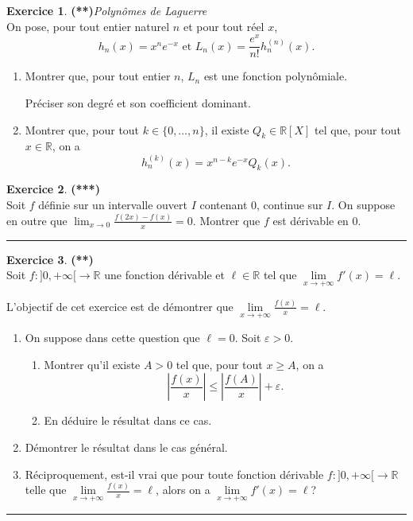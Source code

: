 \documentclass[a4paper,11pt]{article}
\theoremstyle{definition}
\newtheorem{exo}{Exercice} %
\begin{document}
	

\begin{exo}\textbf{(**)}\quad\textit{Polynômes de Laguerre}\\[0.25cm]
On pose, pour tout entier naturel $n$ et pour tout réel $x$, 
$$h_n(x)=x^ne^{-x}\textrm{ et }L_n(x)=\frac{e^x}{n!}h_n^{(n)}(x).$$
\begin{enumerate}
	\item Montrer que, pour tout entier $n$, $L_n$ est une fonction polynômiale. 
	
	Préciser son degré et son coefficient dominant.
	\item Montrer que, pour tout $k\in\{0,\dots,n\}$, il existe $Q_k\in\mathbb R[X]$ tel que, pour tout $x\in\mathbb R$, on a
	$$h_n^{(k)}(x)=x^{n-k}e^{-x}Q_k(x).$$
\end{enumerate}

	
\end{exo}


\begin{exo}\textbf{(***)}\quad\\[0.25cm]
	Soit $f$ définie sur un intervalle ouvert $I$ contenant $0$, continue sur $I$.
	On suppose en outre que $\lim_{x\to 0}\frac{f(2x)-f(x)}{x}=0$. Montrer que $f$ est dérivable en 0.
	
	\centering
	\rule{1\linewidth}{0.6pt}
\end{exo}

\begin{exo}\textbf{(**)}\quad\\[0.25cm]
	Soit $f:]0,+\infty[\to\mathbb R$ une fonction dérivable et $\ell\in\mathbb R$ tel que $\lim\limits_{x\to+\infty}f'(x)=\ell$.
	
	 L'objectif de cet exercice est de démontrer que $\lim\limits_{x\to+\infty}\frac{f(x)}x=\ell$. 
	\begin{enumerate}
		\item On suppose dans cette question que $\ell=0$. Soit $\varepsilon>0$.
		\begin{enumerate}
			\item Montrer qu'il existe $A>0$ tel que, pour tout $x\geq A$, on a 
			$$\left|\frac{f(x)}{x}\right|\leq \left|\frac{f(A)}{x}\right|+\varepsilon.$$
			\item En déduire le résultat dans ce cas.
		\end{enumerate}
		\item Démontrer le résultat dans le cas général.
		\item Réciproquement, est-il vrai que pour toute fonction dérivable $f:]0,+\infty[\to \mathbb R$ telle que $\lim\limits_{x\to+\infty}\frac{f(x)}x=\ell$, alors on a $\lim\limits_{x\to+\infty}f'(x)=\ell$?
	\end{enumerate}
	
	\centering
	\rule{1\linewidth}{0.6pt}
\end{exo}
\end{document}
